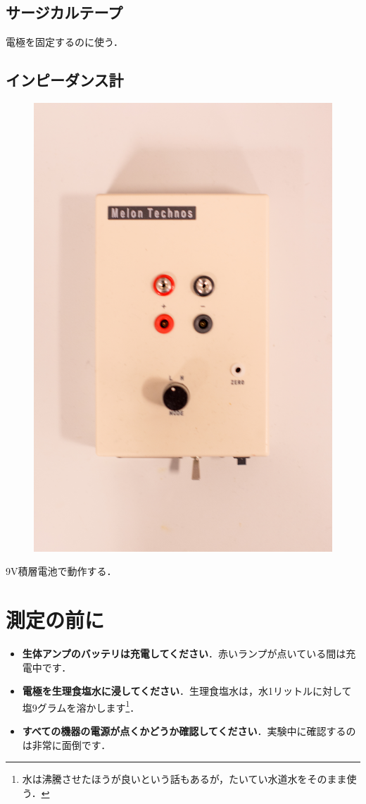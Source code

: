 \documentclass[a4j, twocolumn, openleft, uplatex, dvipdfmx]{jsbook}
\begin{document}
        \subsection*{サージカルテープ}
            電極を固定するのに使う．
        \subsection*{インピーダンス計}
            \begin{figure}[H]
                \centering
                \includegraphics[width=0.5\linewidth]{./figure/impedance.jpg}
            \end{figure}
            9V積層電池で動作する．

    \section{測定の前に}
    \label{sec:section label}
    \begin{itemize}
        \item \textbf{\gtfamily 生体アンプのバッテリは充電してください}．赤いランプが点いている間は充電中です．
        \item \textbf{\gtfamily 電極を生理食塩水に浸してください}．生理食塩水は，水1リットルに対して塩9グラムを溶かします\footnote{水は沸騰させたほうが良いという話もあるが，たいてい水道水をそのまま使う．}．
        \item \textbf{\gtfamily すべての機器の電源が点くかどうか確認してください}．実験中に確認するのは非常に面倒です．
    \end{itemize}
\end{document}
